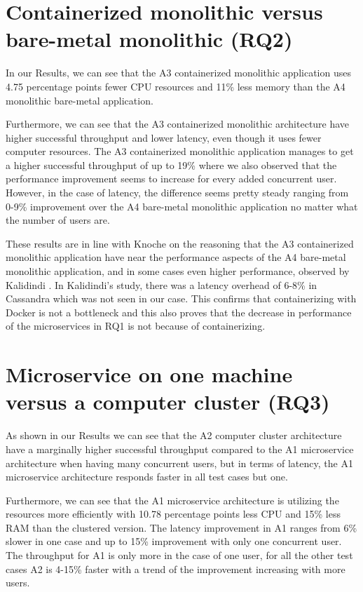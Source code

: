 \documentclass[a4paper,oneside]{bth}
\begin{document}
\section{Containerized monolithic versus bare-metal monolithic (RQ2)}
In our Results, we can see that the A3 containerized monolithic application uses 4.75 percentage points fewer CPU resources and 11\% less memory than the A4 monolithic bare-metal application.

\par\vspace{0.5cm}
Furthermore, we can see that the A3 containerized monolithic architecture have higher successful throughput and lower latency, even though it uses fewer computer resources. The A3 containerized monolithic application manages to get a higher successful throughput of up to 19\% where we also observed that the performance improvement seems to increase for every added concurrent user. However, in the case of latency, the difference seems pretty steady ranging from 0-9\% improvement over the A4 bare-metal monolithic application no matter what the number of users are.

\par\vspace{0.5cm}
These results are in line with Knoche \cite{Knoche} on the reasoning that the A3 containerized monolithic application have near the performance aspects of the A4 bare-metal monolithic application, and in some cases even higher performance, observed by Kalidindi \cite{Kalidindi}. In Kalidindi's study, there was a latency overhead of 6-8\% in Cassandra which was not seen in our case. This confirms that containerizing with Docker is not a bottleneck and this also proves that the decrease in performance of the microservices in RQ1 is not because of containerizing. 

\section{Microservice on one machine versus a computer cluster (RQ3)}
As shown in our Results we can see that the A2 computer cluster architecture have a marginally higher successful throughput compared to the A1 microservice architecture when having many concurrent users, but in terms of latency, the A1 microservice architecture responds faster in all test cases but one.

\par\vspace{0.5cm}
Furthermore, we can see that the A1 microservice architecture is utilizing the resources more efficiently with 10.78 percentage points less CPU and 15\% less RAM than the clustered version. The latency improvement in A1 ranges from 6\% slower in one case and up to 15\% improvement with only one concurrent user. The throughput for A1 is only more in the case of one user, for all the other test cases A2 is 4-15\% faster with a trend of the improvement increasing with more users.
\end{document}
